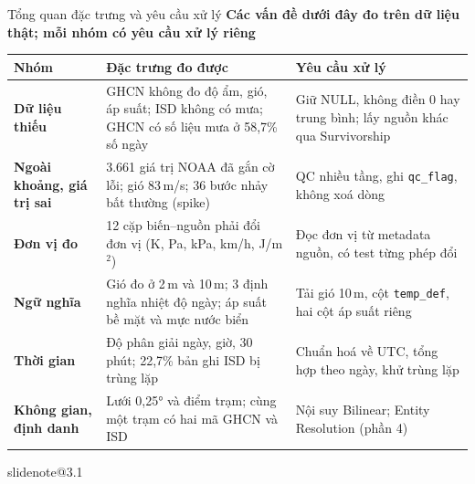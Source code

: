 \documentclass[t,aspectratio=169,12pt]{beamer}
\makeatletter
\newcommand{\slidenote}[1]{\ifcsname slidenote@#1\endcsname\note{\csname slidenote@#1\endcsname}\fi}
\newcommand{\ychinh}[1]{\vskip1mm{\bfseries #1}\par\vskip1mm}
\makeatother
\begin{document}
\begin{frame}{Tổng quan đặc trưng và yêu cầu xử lý}
  \ychinh{Các vấn đề dưới đây đo trên dữ liệu thật; mỗi nhóm có yêu cầu xử lý riêng}
  \scriptsize
  \renewcommand{\arraystretch}{1.0}
  \begin{tabular}{@{}>{\bfseries\leavevmode\color{hustblue}}p{2.3cm}p{6.1cm}p{5.2cm}@{}}
    \toprule
    \color{black}Nhóm & Đặc trưng đo được & Yêu cầu xử lý \\
    \midrule
    Dữ liệu thiếu & GHCN không đo độ ẩm, gió, áp suất; ISD không có mưa; GHCN có số liệu mưa ở 58,7\% số ngày & Giữ NULL, không điền 0 hay trung bình; lấy nguồn khác qua Survivorship \\
    Ngoài khoảng, giá trị sai & 3.661 giá trị NOAA đã gắn cờ lỗi; gió 83\,m/s; 36 bước nhảy bất thường (spike) & QC nhiều tầng, ghi \texttt{qc\_flag}, không xoá dòng \\
    Đơn vị đo & 12 cặp biến--nguồn phải đổi đơn vị (K, Pa, kPa, km/h, J/m$^2$) & Đọc đơn vị từ metadata nguồn, có test từng phép đổi \\
    Ngữ nghĩa & Gió đo ở 2\,m và 10\,m; 3 định nghĩa nhiệt độ ngày; áp suất bề mặt và mực nước biển & Tải gió 10\,m, cột \texttt{temp\_def}, hai cột áp suất riêng \\
    Thời gian & Độ phân giải ngày, giờ, 30 phút; 22,7\% bản ghi ISD bị trùng lặp & Chuẩn hoá về UTC, tổng hợp theo ngày, khử trùng lặp \\
    Không gian, định danh & Lưới 0,25° và điểm trạm; cùng một trạm có hai mã GHCN và ISD & Nội suy Bilinear; Entity Resolution (phần 4) \\
    \bottomrule
  \end{tabular}
  \slidenote{3.1}
\end{frame}
\end{document}
